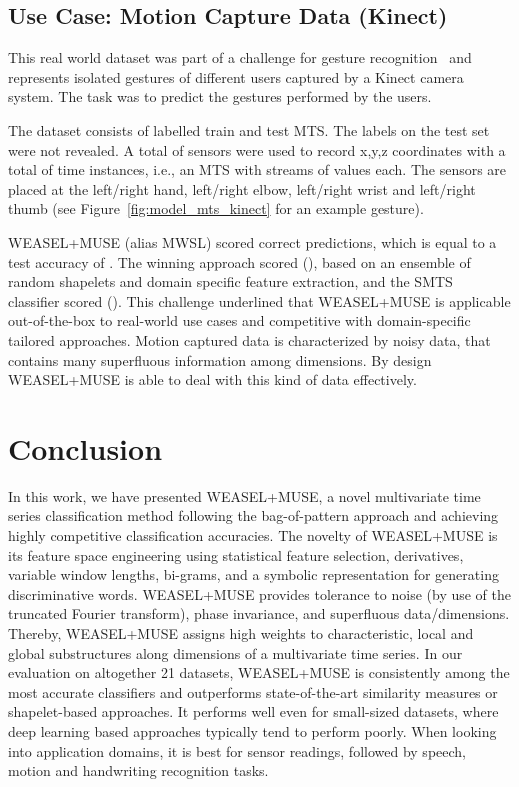 \documentclass[sigconf]{acmart}
\begin{document}
 
\subsection{Use Case: Motion Capture Data (Kinect)}\label{subsec:usecase}

This real world dataset was part of a challenge for gesture recognition~\cite{AALTD_CHALLENGE_16} and represents isolated gestures of different users captured by a Kinect camera system. The task was to predict the gestures performed by the users. 

The dataset consists of  labelled train and  test MTS. The labels on the test set were not revealed. A total of  sensors were used to record x,y,z coordinates with a total of  time instances, i.e., an MTS with  streams of  values each. The sensors are placed at the left/right hand, left/right elbow, left/right wrist and left/right thumb (see Figure~\ref{fig:model_mts_kinect} for an example gesture). 

WEASEL+MUSE (alias MWSL) scored  correct predictions, which is equal to a test accuracy of . The winning approach scored  (), based on an ensemble of random shapelets and domain specific feature extraction, and the SMTS~\cite{baydogan2015learning} classifier scored  (). 
This challenge underlined that WEASEL+MUSE is applicable out-of-the-box to real-world use cases and competitive with domain-specific tailored approaches.
Motion captured data is characterized by noisy data, that contains many superfluous information among dimensions. By design WEASEL+MUSE is able to deal with this kind of data effectively.

\section{Conclusion}

In this work, we have presented WEASEL+MUSE, a novel multivariate time series classification method following the bag-of-pattern approach and achieving highly competitive classification accuracies. The novelty of WEASEL+MUSE is its feature space engineering using statistical feature selection, derivatives, variable window lengths, bi-grams, and a symbolic representation for generating discriminative words. WEASEL+MUSE provides tolerance to noise (by use of the truncated Fourier transform), phase invariance, and superfluous data/dimensions. Thereby, WEASEL+MUSE assigns high weights to characteristic, local and global substructures along dimensions of a multivariate time series. In our evaluation on altogether 21 datasets, WEASEL+MUSE is consistently among the most accurate classifiers and outperforms state-of-the-art similarity measures or shapelet-based approaches. It performs well even for small-sized  datasets, where deep learning based approaches typically tend to perform poorly. When looking into application domains, it is best for sensor readings, followed by speech, motion and handwriting recognition tasks.
\end{document}

